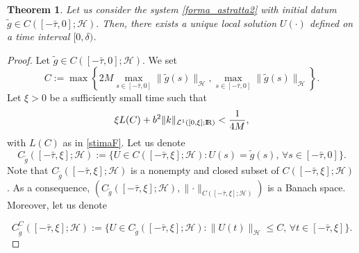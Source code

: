 \documentclass[11pt]{article}
\newcommand{\RR}{{{\rm I} \kern -.15em {\rm R} }}
\newtheorem{Theorem}{Theorem}[section]
\renewcommand{\leq}{\leqslant}
\begin{document}
\begin{Theorem}
	\label{lemma1senzabound}
	Let us consider the system \eqref{forma_astratta2} with initial datum $\tilde g\in C([-\bar{\tau},0]; \mathcal{H}).$ Then, there exists a unique local solution $U(\cdot)$ defined on a time  interval $[0,\delta)$. 
\end{Theorem}
\begin{proof}
	Let $\tilde g\in C([-\bar{\tau},0]; \mathcal{H})$. We set
	$$C:=\max\left\{2M\max_{s\in[-\bar{\tau},0]}\lVert \tilde{g}(s)\rVert_{\mathcal{H}},\max_{s\in[-\bar{\tau},0]}\lVert \tilde{g}(s)\rVert_{\mathcal{H}}\right\}.$$ 
	Let $\xi >0$ be a sufficiently small time such that
	\begin{equation}\label{smalltime}
		\xi L(C)+b^2\lVert k\rVert_{\mathcal{L}^1([0,\xi];\RR)}<\frac{1}{4M},
	\end{equation}
with $L(C)$ as in \eqref{stimaF}.
	Let us denote 
	$$C_{\tilde{g}}([-\bar\tau,\xi];{\mathcal H}):=\{U\in C([-\bar\tau,\xi];{\mathcal H}):U(s)=\tilde{g}(s),\, \forall s\in [-\bar\tau,0]\}.$$ Note that $ C_{\tilde{g}}([-\bar\tau,\xi];{\mathcal H})$ is a nonempty and closed subset of $C([-\bar\tau,\xi];{\mathcal H})$.
	As a consequence, $( C_{\tilde{g}}([-\bar\tau,\xi];{\mathcal H}),\lVert \cdot\rVert_{C([-\bar\tau,\xi];{\mathcal H})})$ is a Banach space.
	Moreover, let us denote 

$$C^C_{\tilde{g}}([-\bar\tau,\xi];{\mathcal H}):=\{U\in C_{\tilde{g}}([-\bar\tau,\xi];{\mathcal H}):\lVert U(t)\rVert_{\mathcal{H}}\leq C,\, \forall t\in [-\bar\tau,\xi]\}.$$


\end{proof}
\end{document}
